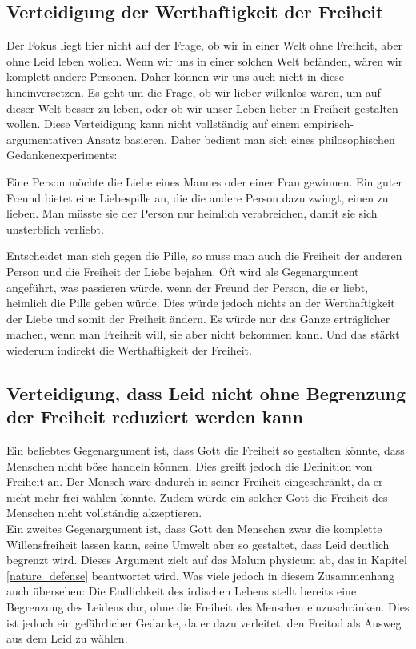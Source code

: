 \subsection{Verteidigung der Werthaftigkeit der Freiheit} \label{Werthaftigkeit_Freiheit}
Der Fokus liegt hier nicht auf der Frage, ob wir in einer Welt ohne Freiheit, aber ohne Leid leben wollen. Wenn wir uns in einer solchen Welt befänden, wären wir komplett andere Personen. Daher können wir uns auch nicht in diese hineinversetzen. Es geht um die Frage, ob wir lieber willenlos wären, um auf dieser Welt besser zu leben, oder ob wir unser Leben lieber in Freiheit gestalten wollen. Diese Verteidigung kann nicht vollständig auf einem empirisch-argumentativen Ansatz basieren. Daher bedient man sich eines philosophischen Gedankenexperiments:

\begin{displayquote}
Eine Person möchte die Liebe eines Mannes oder einer Frau gewinnen. Ein guter Freund bietet eine Liebespille an, die die andere Person dazu zwingt, einen zu lieben. Man müsste sie der Person nur heimlich verabreichen, damit sie sich unsterblich verliebt.
\end{displayquote}

Entscheidet man sich gegen die Pille, so muss man auch die Freiheit der anderen Person und die Freiheit der Liebe bejahen. Oft wird als Gegenargument angeführt, was passieren würde, wenn der Freund der Person, die er liebt, heimlich die Pille geben würde. Dies würde jedoch nichts an der Werthaftigkeit der Liebe und somit der Freiheit ändern. Es würde nur das Ganze erträglicher machen, wenn man Freiheit will, sie aber nicht bekommen kann. Und das stärkt wiederum indirekt die Werthaftigkeit der Freiheit.

\subsection{Verteidigung, dass Leid nicht ohne Begrenzung der Freiheit reduziert werden kann} \label{Begrenzung_Freiheit}
Ein beliebtes Gegenargument ist, dass Gott die Freiheit so gestalten könnte, dass Menschen nicht böse handeln können. Dies greift jedoch die Definition von Freiheit an. Der Mensch wäre dadurch in seiner Freiheit eingeschränkt, da er nicht mehr frei wählen könnte. Zudem würde ein solcher Gott die Freiheit des Menschen nicht vollständig akzeptieren.\\

Ein zweites Gegenargument ist, dass Gott den Menschen zwar die komplette Willensfreiheit lassen kann, seine Umwelt aber so gestaltet, dass Leid deutlich begrenzt wird. Dieses Argument zielt auf das Malum physicum ab, das in Kapitel \ref{nature_defense}  beantwortet wird. Was viele jedoch in diesem Zusammenhang auch übersehen: Die Endlichkeit des irdischen Lebens stellt bereits eine Begrenzung des Leidens dar, ohne die Freiheit des Menschen einzuschränken. Dies ist jedoch ein gefährlicher Gedanke, da er dazu verleitet, den Freitod als Ausweg aus dem Leid zu wählen.


